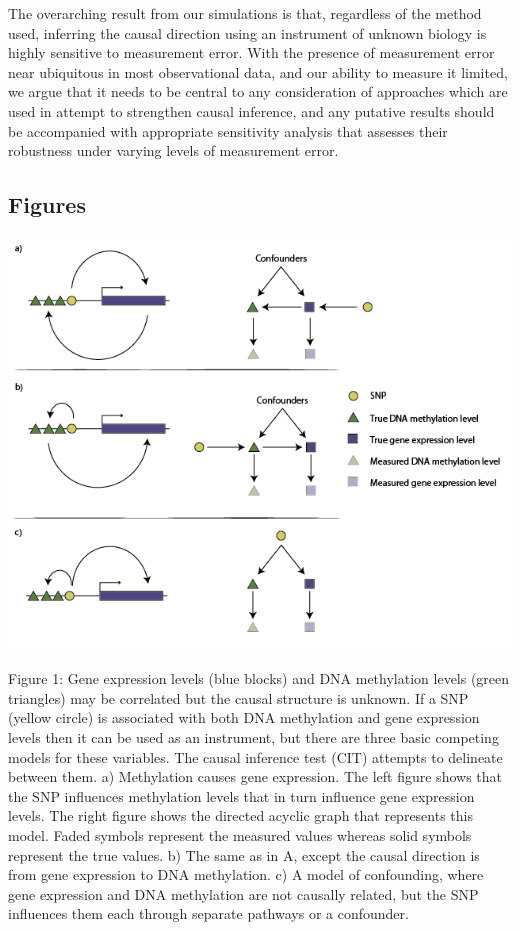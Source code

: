 \documentclass[]{article}
\begin{document}
The overarching result from our simulations is that, regardless of the
method used, inferring the causal direction using an instrument of
unknown biology is highly sensitive to measurement error. With the
presence of measurement error near ubiquitous in most observational
data, and our ability to measure it limited, we argue that it needs to
be central to any consideration of approaches which are used in attempt
to strengthen causal inference, and any putative results should be
accompanied with appropriate sensitivity analysis that assesses their
robustness under varying levels of measurement error.

\newpage

\subsection{Figures}\label{figures}

\includegraphics{../images/dag-01.png}

Figure 1: Gene expression levels (blue blocks) and DNA methylation
levels (green triangles) may be correlated but the causal structure is
unknown. If a SNP (yellow circle) is associated with both DNA
methylation and gene expression levels then it can be used as an
instrument, but there are three basic competing models for these
variables. The causal inference test (CIT) attempts to delineate between
them. a) Methylation causes gene expression. The left figure shows that
the SNP influences methylation levels that in turn influence gene
expression levels. The right figure shows the directed acyclic graph
that represents this model. Faded symbols represent the measured values
whereas solid symbols represent the true values. b) The same as in A,
except the causal direction is from gene expression to DNA methylation.
c) A model of confounding, where gene expression and DNA methylation are
not causally related, but the SNP influences them each through separate
pathways or a confounder.
\end{document}
